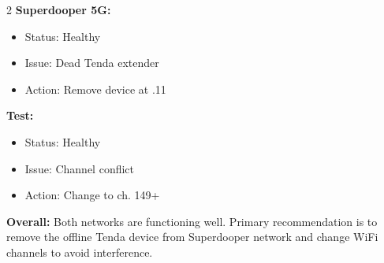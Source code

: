 \documentclass[11pt,letterpaper]{article}
\begin{document}
\begin{tcolorbox}[colback=green!5,colframe=green!50!black,title=Network Health Summary]
\begin{multicols}{2}
\textbf{Superdooper 5G:}
\begin{itemize}[noitemsep]
    \item Status: Healthy
    \item Issue: Dead Tenda extender
    \item Action: Remove device at .11
\end{itemize}
\columnbreak
\textbf{Test:}
\begin{itemize}[noitemsep]
    \item Status: Healthy
    \item Issue: Channel conflict
    \item Action: Change to ch. 149+
\end{itemize}
\end{multicols}

\textbf{Overall:} Both networks are functioning well. Primary recommendation is to remove the offline Tenda device from Superdooper network and change WiFi channels to avoid interference.
\end{tcolorbox}
\end{document}
